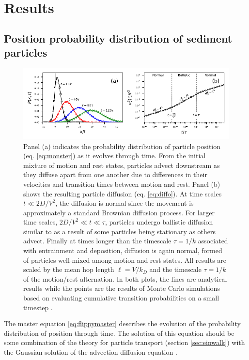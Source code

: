\section{Results \label{sec:res}}
\subsection{Position probability distribution of sediment particles}
\begin{figure}
	\centerline{\includegraphics{figures/ch2/figure2_slopeKey.pdf}}
	\caption{Panel (a) indicates the probability distribution of particle position (eq. \ref{eq:monster}) as it evolves through time. From the initial mixture of motion and rest states, particles advect downstream as they diffuse apart from one another due to differences in their velocities and transition times between motion and rest. Panel (b) shows the resulting particle diffusion (eq. \ref{eq:diffo}). At time scales $t \ll 2D/V^2$, the diffusion is normal since the movement is approximately a standard Brownian diffusion process. For larger time scales, $2D/V^2 \ll t \ll \tau$, particles undergo ballistic diffusion similar to \citet{Lisle1998} as a result of some particles being stationary as others advect. Finally at times longer than the timescale $\tau = 1/k$ associated with entrainment and deposition, diffusion is again normal, formed of particles well-mixed among motion and rest states. All results are scaled by the mean hop length $\ell=V/k_D$ and the timescale $\tau=1/k$ of the motion/rest alternation. In both plots, the lines are analytical results while the points are the results of Monte Carlo simulations based on evaluating cumulative transition probabilities on a small timestep \citep[e.g.][]{Barik2006}.}
	\label{fig:flippyfig1}
\end{figure}
The master equation \ref{eq:flippymaster} describes the evolution of the probability distribution of position through time. The solution of this equation should be some combination of the \citet{Einstein1937} theory for particle transport (section \ref{sec:einwalk}) with the Gaussian solution of the advection-diffusion equation \citep{Morse1953a}.

